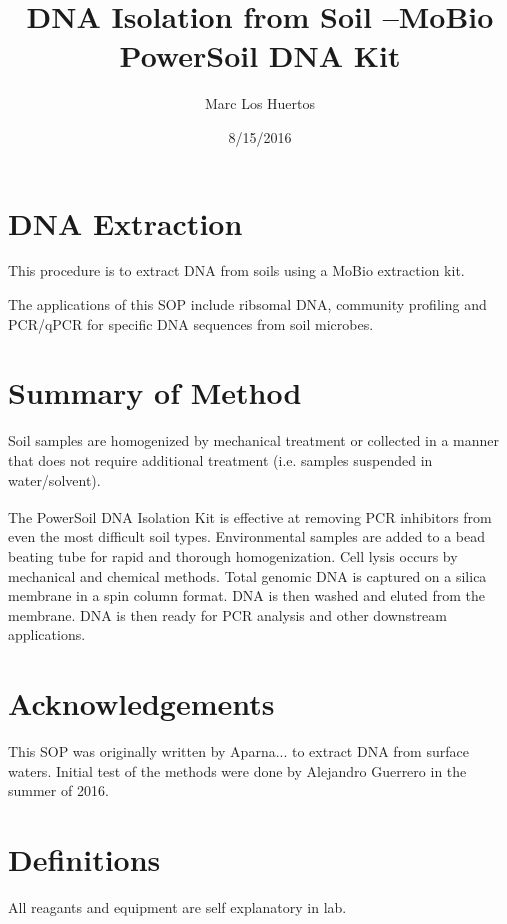 \documentclass[12pt]{../SOP4_alpha}\usepackage[]{graphicx}\usepackage[]{xcolor}
\title{DNA Isolation from Soil --MoBio PowerSoil DNA Kit}
\date{8/15/2016}
\author{Marc Los Huertos}
\begin{document}

\maketitle

\section{DNA Extraction }

\NP This procedure is to extract DNA from soils using a MoBio extraction kit. 

\NP The applications of this SOP include ribsomal DNA, community profiling and PCR/qPCR for specific DNA sequences from soil microbes. 

\section{Summary of Method}

Soil samples are homogenized by mechanical treatment or collected in a manner that does not require additional treatment (i.e. samples suspended in water/solvent). 

The PowerSoil\textsuperscript{\textregistered} DNA Isolation Kit is effective at removing PCR inhibitors from even
the most difficult soil types. Environmental samples are added to a bead beating
tube for rapid and thorough homogenization. Cell lysis occurs by mechanical and
chemical methods. Total genomic DNA is captured on a silica membrane in a spin
column format. DNA is then washed and eluted from the membrane. DNA is then
ready for PCR analysis and other downstream applications. 

\tableofcontents

\newpage

\section{Acknowledgements}

\NP This SOP was originally written by Aparna... to extract DNA from surface waters. Initial test of the methods were done by Alejandro Guerrero in the summer of 2016. 

\section{Definitions}

\NP All reagants and equipment are self explanatory in lab. 
\end{document}

